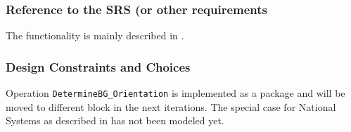 \documentclass{template/openetcs_report}
\begin{document}
\subsubsection{Reference to the SRS (or other requirements}
The functionality is mainly described in \cite[Chapter~3.6.3]{subset-026}.

\subsubsection{Design Constraints and Choices}
Operation \verb+DetermineBG_Orientation+ is implemented as a package and will be moved to different block in the next iterations. The special case for National Systems as described in \cite[Chapter~3.6.3.1.4.1]{subset-026} has not been modeled yet.



\appendix


%
%
%
%


\newpage
{}
\printindex

\end{document}
